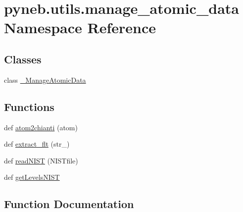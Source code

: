 \hypertarget{namespacepyneb_1_1utils_1_1manage__atomic__data}{}\section{pyneb.\+utils.\+manage\+\_\+atomic\+\_\+data Namespace Reference}
\label{namespacepyneb_1_1utils_1_1manage__atomic__data}
\subsection*{Classes}
\begin{DoxyCompactItemize}
\item 
class \hyperlink{classpyneb_1_1utils_1_1manage__atomic__data_1_1___manage_atomic_data}{\+\_\+\+Manage\+Atomic\+Data}
\end{DoxyCompactItemize}
\subsection*{Functions}
\begin{DoxyCompactItemize}
\item 
def \hyperlink{namespacepyneb_1_1utils_1_1manage__atomic__data_a9c992b2ae01f2e369be5d539172f78a0}{atom2chianti} (atom)
\item 
def \hyperlink{namespacepyneb_1_1utils_1_1manage__atomic__data_a211c531a869b2e0789e557b2a15a892c}{extract\+\_\+flt} (str\+\_\+)
\item 
def \hyperlink{namespacepyneb_1_1utils_1_1manage__atomic__data_ab843a6f51ebb888e83a849835e49a885}{read\+N\+I\+S\+T} (N\+I\+S\+Tfile)
\item 
def \hyperlink{namespacepyneb_1_1utils_1_1manage__atomic__data_ad09376e8676854d44680ae14210b5589}{get\+Levels\+N\+I\+S\+T}
\end{DoxyCompactItemize}


\subsection{Function Documentation}
\hypertarget{namespacepyneb_1_1utils_1_1manage__atomic__data_a9c992b2ae01f2e369be5d539172f78a0}{}
